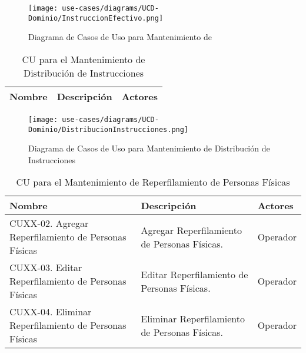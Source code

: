 	\begin{figure}[H]
		\begin{center}
		\label{tab:ucd-entity-instruccionefectivo}
		\texttt{[image: use-cases/diagrams/UCD-Dominio/InstruccionEfectivo.png]}
		\caption{Diagrama de Casos de Uso para Mantenimiento de }
		\end{center}
	\end{figure}
	\begin{table}[H]
		\caption{CU para el Mantenimiento de Distribuci\'on de Instrucciones}
		\label{uc-entity-distribucioninstrucciones}
		\begin{center}
		\begin{tabularx}{0.90\linewidth}{ X X X }
			\hline
			\textbf{Nombre} & \textbf{Descripci\'on} & \textbf{Actores} \\
			\hline
			\hline
		\end{tabularx}
		\end{center}
	\end{table}
	
	\begin{figure}[H]
		\begin{center}
		\label{tab:ucd-entity-distribucioninstrucciones}
		\texttt{[image: use-cases/diagrams/UCD-Dominio/DistribucionInstrucciones.png]}
		\caption{Diagrama de Casos de Uso para Mantenimiento de Distribuci\'on de Instrucciones}
		\end{center}
	\end{figure}
	\begin{table}[H]
		\caption{CU para el Mantenimiento de Reperfilamiento de Personas F\'isicas}
		\label{uc-entity-reperfilamientopersonafisica}
		\begin{center}
		\begin{tabularx}{0.90\linewidth}{ X X X }
			\hline
			\textbf{Nombre} & \textbf{Descripci\'on} & \textbf{Actores} \\
			\hline
			CUXX-02. Agregar Reperfilamiento de Personas F\'isicas & Agregar Reperfilamiento de Personas F\'isicas. & Operador \\
			CUXX-03. Editar Reperfilamiento de Personas F\'isicas & Editar Reperfilamiento de Personas F\'isicas. & Operador \\
			CUXX-04. Eliminar Reperfilamiento de Personas F\'isicas & Eliminar Reperfilamiento de Personas F\'isicas. & Operador \\
			\hline
		\end{tabularx}
		\end{center}
	\end{table}
	
